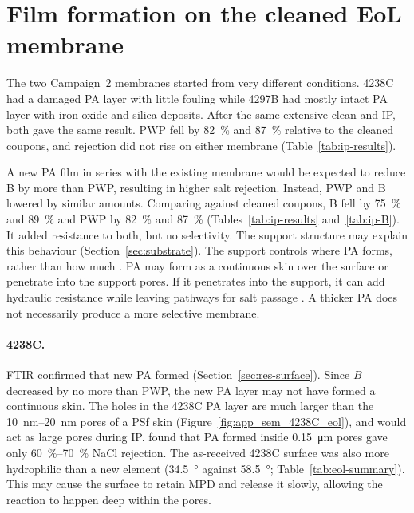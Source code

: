 
\section{Film formation on the cleaned EoL membrane}
\label{sec:res-cleaning-effect}
\label{sec:res-film}
The two Campaign~2 membranes started from very different conditions. 4238C had a damaged PA layer with little fouling while 4297B had mostly intact PA layer with iron oxide and silica deposits. After the same extensive clean and IP, both gave the same result. PWP fell by \qty{82}{\percent} and \qty{87}{\percent} relative to the cleaned coupons, and rejection did not rise on either membrane (Table~\ref{tab:ip-results}). 

A new PA film in series with the existing membrane would be expected to reduce B by more than PWP, resulting in higher salt rejection. Instead, PWP and B lowered by similar amounts. Comparing against cleaned coupons, B fell by \qty{75}{\percent} and \qty{89}{\percent} and PWP by \qty{82}{\percent} and \qty{87}{\percent} (Tables~\ref{tab:ip-results} and~\ref{tab:ip-B}). It added resistance to both, but no selectivity. The support structure may explain this behaviour (Section~\ref{sec:substrate}). The support controls where PA forms, rather than how much \citep{GhoshHoek2009}. PA may form as a continuous skin over the surface or penetrate into the support pores. If it penetrates into the support, it can add hydraulic resistance while leaving pathways for salt passage \citep{Singh2006}. A thicker PA does not necessarily produce a more selective membrane. 

\paragraph{4238C.}
FTIR confirmed that new PA formed (Section~\ref{sec:res-surface}). Since $B$ decreased by no more than PWP, the new PA layer may not have formed a continuous skin. The holes in the 4238C PA layer are much larger than the \qtyrange{10}{20}{\nano\metre} pores of a PSf skin (Figure~\ref{fig:app_sem_4238C_eol}), and would act as large pores during IP. \citet{Singh2006} found that PA formed inside \qty{0.15}{\micro\metre} pores gave only \qtyrange{60}{70}{\percent} NaCl rejection. The as-received 4238C surface was also more hydrophilic than a new element (\qty{34.5}{\degree} against \qty{58.5}{\degree}; Table~\ref{tab:eol-summary}). This may cause the surface to retain MPD and release it slowly, allowing the reaction to happen deep within the pores.

